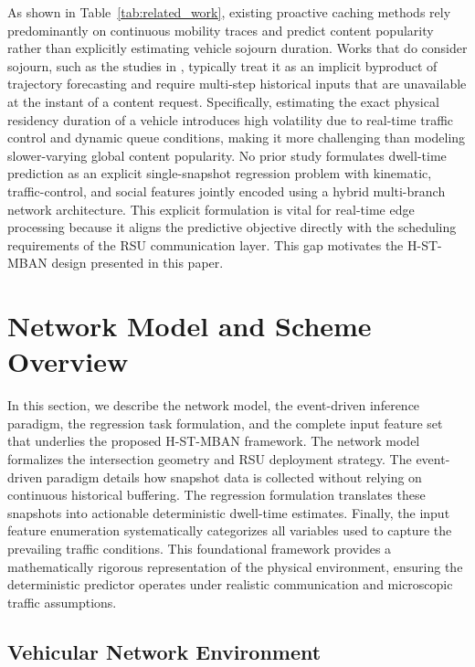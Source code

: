 \documentclass[journal]{IEEEtran}
\begin{document}
As shown in Table~\ref{tab:related_work}, existing proactive caching methods rely predominantly on continuous mobility traces and predict content popularity rather than explicitly estimating vehicle sojourn duration.
Works that do consider sojourn, such as the studies in \cite{4,7,23}, typically treat it as an implicit byproduct of trajectory forecasting and require multi-step historical inputs that are unavailable at the instant of a content request.
Specifically, estimating the exact physical residency duration of a vehicle introduces high volatility due to real-time traffic control and dynamic queue conditions, making it more challenging than modeling slower-varying global content popularity.
No prior study formulates dwell-time prediction as an explicit single-snapshot regression problem with kinematic, traffic-control, and social features jointly encoded using a hybrid multi-branch network architecture.
This explicit formulation is vital for real-time edge processing because it aligns the predictive objective directly with the scheduling requirements of the RSU communication layer.
This gap motivates the H-ST-MBAN design presented in this paper.

\section{Network Model and Scheme Overview}\label{sec:system}

In this section, we describe the network model, the event-driven inference paradigm, the regression task formulation, and the complete input feature set that underlies the proposed H-ST-MBAN framework. The network model formalizes the intersection geometry and RSU deployment strategy. The event-driven paradigm details how snapshot data is collected without relying on continuous historical buffering. The regression formulation translates these snapshots into actionable deterministic dwell-time estimates. Finally, the input feature enumeration systematically categorizes all variables used to capture the prevailing traffic conditions. This foundational framework provides a mathematically rigorous representation of the physical environment, ensuring the deterministic predictor operates under realistic communication and microscopic traffic assumptions.

\subsection{Vehicular Network Environment}
\label{sec.net.A}
\end{document}
